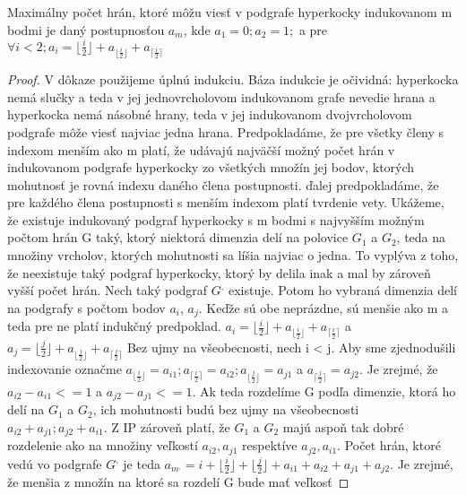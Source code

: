 \begin{veta}
\label{maximum}
Maximálny počet hrán, ktoré môžu viesť v podgrafe hyperkocky indukovanom m
bodmi je daný postupnosťou $a_{m}$, kde $a_{1} = 0; a_{2} = 1;$ a pre 
$\forall i < 2; a_{i} = \lfloor \frac {i}{2} \rfloor + a_{\lfloor \frac{i}{2}
\rfloor}
+ a_{\lceil \frac {i}{2} \rceil } $
\end{veta}
\begin{proof}
V dôkaze použijeme úplnú indukciu. Báza indukcie je očividná: hyperkocka
nemá slučky a teda v jej jednovrcholovom indukovanom grafe nevedie 
hrana a hyperkocka nemá
násobné hrany, teda v jej indukovanom dvojvrcholovom podgrafe 
môže viesť najviac jedna hrana. Predpokladáme, že pre všetky členy s
indexom menším ako m platí, že udávajú najväčší možný počet hrán v
indukovanom podgrafe hyperkocky zo všetkých množín jej bodov, ktorých 
mohutnosť je rovná  indexu daného člena postupnosti. ďalej predpokladáme, že
pre každého člena postupnosti s menším indexom platí tvrdenie vety.
Ukážeme, že existuje indukovaný podgraf hyperkocky s m bodmi 
s najvyšším možným počtom hrán G taký, ktorý niektorá dimenzia delí na
polovice $G_{1}$ a $G_{2}$, teda na množiny vrcholov, ktorých mohutnosti 
sa líšia najviac o
jedna. To vyplýva z toho, že neexistuje taký podgraf hyperkocky, 
ktorý by delila inak a mal by zároveň vyšší počet hrán.
Nech taký podgraf $G^{,}$ existuje. Potom ho vybraná dimenzia delí na podgrafy s
počtom bodov $a_{i}$, $a_{j}$. Keďže sú obe neprázdne, sú menšie ako m a teda
pre ne platí indukčný predpoklad. $a_{i} = \lfloor \frac {i}{2} \rfloor + 
a_{\lfloor \frac{i}{2} \rfloor}+ a_{\lceil \frac {i}{2} \rceil }$ a $a_{j} = 
\lfloor \frac {j}{2} \rfloor + 
a_{\lfloor \frac{j}{2} \rfloor}+ a_{\lceil \frac {j}{2} \rceil }$
Bez ujmy na všeobecnosti, nech i < j. Aby sme zjednodušili indexovanie
označme $a_{\lfloor \frac{i}{2} \rfloor} = a_{i1}; a_{\lceil \frac {i}{2} \rceil }
= a_{i2}; a_{\lfloor \frac{j}{2} \rfloor} = a_{j1}$ a $a_{\lceil \frac {j}{2} \rceil }
= a_{j2}$.
Je zrejmé, že $a_{i2} - a_{i1} <= 1$ a $a_{j2} - a_{j1} <= 1$. Ak teda
rozdelíme G podľa dimenzie, ktorá ho delí na $G_{1}$ a $G_{2}$, ich mohutnosti
budú bez ujmy na všeobecnosti $a_{i2} + a_{j1}; a_{j2} + a_{i1}$. Z IP
zároveň platí, že $G_{1}$ a $G_{2}$ majú aspoň tak dobré rozdelenie ako na
množiny veľkostí $a_{i2}, a_{j1}$ respektíve $a_{j2}, a_{i1}$.
Počet hrán, ktoré vedú vo podgrafe $G^{,}$ je teda
$a_{m^{,}}=i + \lfloor \frac{i}{2} \rfloor 
+ \lfloor \frac{j}{2} \rfloor + a_{i1} + a_{i2} + a_{j1} + a_{j2}$.
Je zrejmé, že menšia z množín na ktoré sa rozdelí G bude mať veľkosť

\end{proof}
